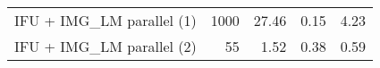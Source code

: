 \begin{table}[ht]
\begin{tabular}{|l|r|r|c|c|}
    IFU + IMG\_LM parallel (1)                    & 1000                                    & 27.46                                     & 0.15                                         & 4.23                                      \\
    IFU + IMG\_LM parallel (2)                    & 55                                      & 1.52                                      & 0.38                                         & 0.59                                      \\
    \hline
  \end{tabular}
\end{table}



